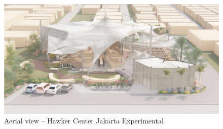 ﻿%
\begin{figure}[H]
	\centering
	\includegraphics[width=\linewidth]{src/graphics/hawker-center-jakarta-experimental--perspective-aerial-view.jpg}
	\caption*{%
		Aerial view -- Hawker Center Jakarta Experimental
	}
	\label{
		fig:hawker-center-jakarta-experimental--perspective-aerial-view
	}
\end{figure}
